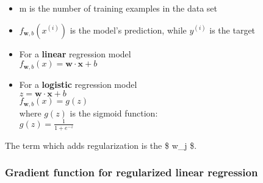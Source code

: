 \documentclass[11pt]{article}
\begin{document}
\begin{itemize}
\item
  m is the number of training examples in the data set\\
\item
  \(f_{\mathbf{w},b}(x^{(i)})\) is the model's prediction, while
  \(y^{(i)}\) is the target
\item
  For a { \textbf{linear} } regression model\\
  \(f_{\mathbf{w},b}(x) = \mathbf{w} \cdot \mathbf{x} + b\)\\
\item
  For a { \textbf{logistic} } regression model\\
  \(z = \mathbf{w} \cdot \mathbf{x} + b\)\\
  \(f_{\mathbf{w},b}(x) = g(z)\)\\
  where \(g(z)\) is the sigmoid function:\\
  \(g(z) = \frac{1}{1+e^{-z}}\)
\end{itemize}

The term which adds regularization is the {\$ w\_j \$}.

    \hypertarget{gradient-function-for-regularized-linear-regression}{%
\subsubsection{Gradient function for regularized linear
regression}\label{gradient-function-for-regularized-linear-regression}}
\end{document}
